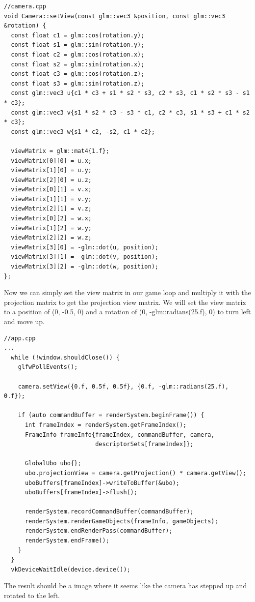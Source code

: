 \documentclass[12pt]{report} \usepackage{preamble}
\begin{document}
\begin{lstlisting}[Language=C++]
//camera.cpp
void Camera::setView(const glm::vec3 &position, const glm::vec3 &rotation) {
  const float c1 = glm::cos(rotation.y);
  const float s1 = glm::sin(rotation.y);
  const float c2 = glm::cos(rotation.x);
  const float s2 = glm::sin(rotation.x);
  const float c3 = glm::cos(rotation.z);
  const float s3 = glm::sin(rotation.z);
  const glm::vec3 u{c1 * c3 + s1 * s2 * s3, c2 * s3, c1 * s2 * s3 - s1 * c3};
  const glm::vec3 v{s1 * s2 * c3 - s3 * c1, c2 * c3, s1 * s3 + c1 * s2 * c3};
  const glm::vec3 w{s1 * c2, -s2, c1 * c2};

  viewMatrix = glm::mat4{1.f};
  viewMatrix[0][0] = u.x;
  viewMatrix[1][0] = u.y;
  viewMatrix[2][0] = u.z;
  viewMatrix[0][1] = v.x;
  viewMatrix[1][1] = v.y;
  viewMatrix[2][1] = v.z;
  viewMatrix[0][2] = w.x;
  viewMatrix[1][2] = w.y;
  viewMatrix[2][2] = w.z;
  viewMatrix[3][0] = -glm::dot(u, position);
  viewMatrix[3][1] = -glm::dot(v, position);
  viewMatrix[3][2] = -glm::dot(w, position);
};
\end{lstlisting}

Now we can simply set the view matrix in our game loop and multiply it with the projection matrix to get the projection view matrix.
We will set the view matrix to a position of (0, -0.5, 0) and a rotation of (0, -glm::radians(25.f), 0) to turn left and move up.

\begin{lstlisting}[Language=C++]
//app.cpp
...
  while (!window.shouldClose()) {
    glfwPollEvents();

    camera.setView({0.f, 0.5f, 0.5f}, {0.f, -glm::radians(25.f), 0.f});

    if (auto commandBuffer = renderSystem.beginFrame()) {
      int frameIndex = renderSystem.getFrameIndex();
      FrameInfo frameInfo{frameIndex, commandBuffer, camera,
                          descriptorSets[frameIndex]};

      GlobalUbo ubo{};
      ubo.projectionView = camera.getProjection() * camera.getView();
      uboBuffers[frameIndex]->writeToBuffer(&ubo);
      uboBuffers[frameIndex]->flush();

      renderSystem.recordCommandBuffer(commandBuffer);
      renderSystem.renderGameObjects(frameInfo, gameObjects);
      renderSystem.endRenderPass(commandBuffer);
      renderSystem.endFrame();
    }
  }
  vkDeviceWaitIdle(device.device());
\end{lstlisting}

The result should be a image where it seems like the camera has stepped up and rotated to the left.
\end{document}

